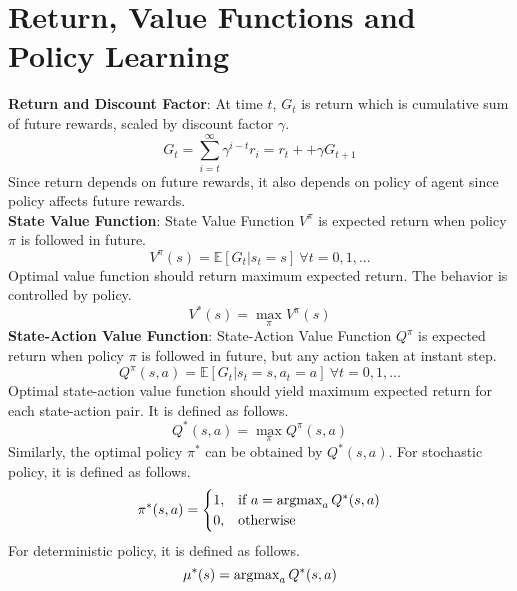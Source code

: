 \section{Return, Value Functions and Policy Learning}
\textbf{Return and Discount Factor}: At time $t$, $G_t$ is return which is cumulative sum of future rewards, scaled by discount factor $\gamma$. \\
\begin{equation}
G_t = \sum_{i=t}^{\infty} \gamma^{i-t} r_i = r_t + + \gamma G_{t+1}
\end{equation}
Since return depends on future rewards, it also depends on policy of agent since policy affects future rewards. \\
\textbf{State Value Function}: State Value Function $V^{\pi}$ is expected return when policy $\pi$ is followed in future. \\
\begin{equation}
V^{\pi}(s) = \mathbb{E}[G_t|s_t=s] \: \forall t = 0,1, ...
\end{equation}
Optimal value function should return maximum expected return. The behavior is controlled by policy. \\
\begin{equation}
V^{*}(s) = \max_{\pi} V^{\pi}(s)
\end{equation}
\textbf{State-Action Value Function}: State-Action Value Function $Q^{\pi}$ is expected return when policy $\pi$ is followed in future, but any action taken at instant step. \\
\begin{equation}
Q^{\pi}(s,a) = \mathbb{E}[G_t|s_t=s, a_t=a] \: \forall t = 0,1, ...
\end{equation}
Optimal state-action value function should yield maximum expected return for each state-action pair. It is defined as follows. \\
\begin{equation}
Q^{*}(s,a) = \max_{\pi} Q^{\pi}(s,a)
\end{equation}
Similarly, the optimal policy $\pi^*$ can be obtained by $Q^{*}(s,a)$. For stochastic policy, it is defined as follows. \\
\begin{equation}
\label{eqn:policy_stochastic_q}
\pi^{*}(s,a) = 
\begin{cases}
1,   & \text{if  } a = \operatorname{\textup{argmax}}_{a} Q^{*}(s,a) \\
0,   & \text{otherwise  }
\end{cases} 
\end{equation}
For deterministic policy, it is defined as follows. \\
\begin{equation}
\label{eqn:policy_deterministic_q}
\mu^{*}(s) = \operatorname{\textup{argmax}}_{a} Q^{*}(s,a)
\end{equation}
